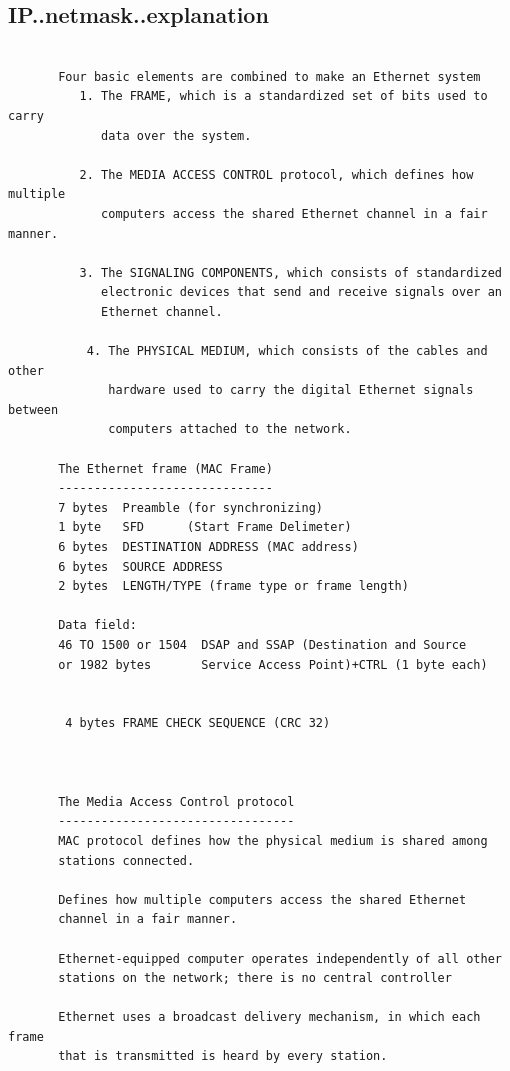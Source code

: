 \documentclass[a4paper,12pt]{article}
\begin{document}
\subsection{IP..netmask..explanation}
\begin{verbatim}
       
       Four basic elements are combined to make an Ethernet system
          1. The FRAME, which is a standardized set of bits used to carry             
             data over the system.

          2. The MEDIA ACCESS CONTROL protocol, which defines how multiple 
             computers access the shared Ethernet channel in a fair manner.

          3. The SIGNALING COMPONENTS, which consists of standardized 
             electronic devices that send and receive signals over an 
             Ethernet channel.

           4. The PHYSICAL MEDIUM, which consists of the cables and other 
              hardware used to carry the digital Ethernet signals between 
              computers attached to the network.
       
       The Ethernet frame (MAC Frame)
       ------------------------------
       7 bytes  Preamble (for synchronizing)
       1 byte   SFD      (Start Frame Delimeter)
       6 bytes  DESTINATION ADDRESS (MAC address)
       6 bytes  SOURCE ADDRESS
       2 bytes  LENGTH/TYPE (frame type or frame length)
       
       Data field:
       46 TO 1500 or 1504  DSAP and SSAP (Destination and Source
       or 1982 bytes       Service Access Point)+CTRL (1 byte each)
      

        4 bytes FRAME CHECK SEQUENCE (CRC 32)
       
       
       
       The Media Access Control protocol
       ---------------------------------
       MAC protocol defines how the physical medium is shared among
       stations connected.
       
       Defines how multiple computers access the shared Ethernet 
       channel in a fair manner.
       
       Ethernet-equipped computer operates independently of all other 
       stations on the network; there is no central controller
       
       Ethernet uses a broadcast delivery mechanism, in which each frame
       that is transmitted is heard by every station.
       

\end{verbatim}
\end{document}
